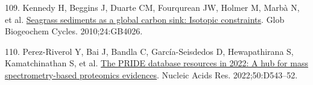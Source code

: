 \documentclass[
  12 pt,
]{article}
\newlength{\cslhangindent}
\newlength{\cslentryspacingunit} %
\newenvironment{CSLReferences}[2] %
 {%
  \setlength{\parindent}{0pt}
  \ifodd #1
  \let\oldpar\par
  \def\par{\hangindent=\cslhangindent\oldpar}
  \fi
  \setlength{\parskip}{#2\cslentryspacingunit}
 }%
 {}
\begin{document}
\begin{CSLReferences}{0}{0}
\leavevmode{}%
109. Kennedy H, Beggins J, Duarte CM, Fourqurean JW, Holmer M, Marbà N, et al. \href{https://doi.org/10.1029/2010GB003848}{Seagrass sediments as a global carbon sink: Isotopic constraints}. Glob Biogeochem Cycles. 2010;24:GB4026.

\leavevmode{}%
110. Perez-Riverol Y, Bai J, Bandla C, García-Seisdedos D, Hewapathirana S, Kamatchinathan S, et al. \href{https://doi.org/10.1093/nar/gkab1038}{The {PRIDE} database resources in 2022: A hub for mass spectrometry-based proteomics evidences}. Nucleic Acids Res. 2022;50:D543--52.

\end{CSLReferences}
\end{document}
